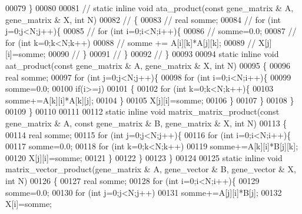 \begin{DoxyCode}
00079   \}
00080 
00081 \textcolor{comment}{//   static inline void ata\_product(const gene\_matrix & A, gene\_matrix & X, int N)}
00082 \textcolor{comment}{//   \{}
00083 \textcolor{comment}{//     real somme;}
00084 \textcolor{comment}{//     for (int j=0;j<N;j++)\{}
00085 \textcolor{comment}{//       for (int i=0;i<N;i++)\{}
00086 \textcolor{comment}{//         somme=0.0;}
00087 \textcolor{comment}{//         for (int k=0;k<N;k++)}
00088 \textcolor{comment}{//           somme += A[i][k]*A[j][k];}
00089 \textcolor{comment}{//         X[j][i]=somme;}
00090 \textcolor{comment}{//       \}}
00091 \textcolor{comment}{//     \}}
00092 \textcolor{comment}{//   \}}
00093 
00094   \textcolor{keyword}{static} \textcolor{keyword}{inline} \textcolor{keywordtype}{void} aat\_product(\textcolor{keyword}{const} gene\_matrix & A, gene\_matrix & X, \textcolor{keywordtype}{int} N)
00095   \{
00096     real somme;
00097     \textcolor{keywordflow}{for} (\textcolor{keywordtype}{int} j=0;j<N;j++)\{
00098       \textcolor{keywordflow}{for} (\textcolor{keywordtype}{int} i=0;i<N;i++)\{
00099         somme=0.0;
00100         \textcolor{keywordflow}{if}(i>=j)
00101         \{
00102           \textcolor{keywordflow}{for} (\textcolor{keywordtype}{int} k=0;k<N;k++)\{
00103             somme+=A[k][i]*A[k][j];
00104           \}
00105           X[j][i]=somme;
00106         \}
00107       \}
00108     \}
00109   \}
00110 
00111 
00112   \textcolor{keyword}{static} \textcolor{keyword}{inline} \textcolor{keywordtype}{void} matrix\_matrix\_product(\textcolor{keyword}{const} gene\_matrix & A, \textcolor{keyword}{const} gene\_matrix & B, gene\_matrix & X, \textcolor{keywordtype}{
      int} N)
00113   \{
00114     real somme;
00115     \textcolor{keywordflow}{for} (\textcolor{keywordtype}{int} j=0;j<N;j++)\{
00116       \textcolor{keywordflow}{for} (\textcolor{keywordtype}{int} i=0;i<N;i++)\{
00117         somme=0.0;
00118         \textcolor{keywordflow}{for} (\textcolor{keywordtype}{int} k=0;k<N;k++)
00119           somme+=A[k][i]*B[j][k];
00120         X[j][i]=somme;
00121       \}
00122     \}
00123   \}
00124 
00125   \textcolor{keyword}{static} \textcolor{keyword}{inline} \textcolor{keywordtype}{void} matrix\_vector\_product(gene\_matrix & A, gene\_vector & B, gene\_vector & X, \textcolor{keywordtype}{int} N)
00126   \{
00127     real somme;
00128     \textcolor{keywordflow}{for} (\textcolor{keywordtype}{int} i=0;i<N;i++)\{
00129       somme=0.0;
00130       \textcolor{keywordflow}{for} (\textcolor{keywordtype}{int} j=0;j<N;j++)
00131         somme+=A[j][i]*B[j];
00132       X[i]=somme;

\end{DoxyCode}
